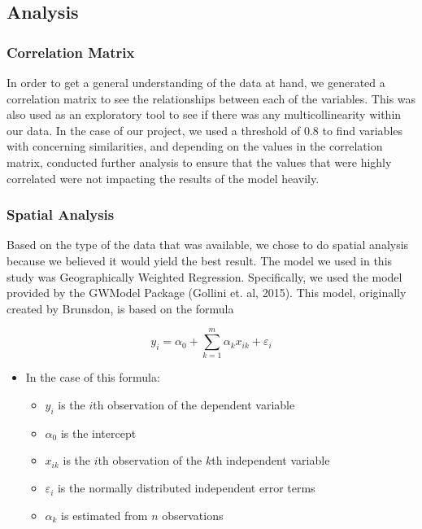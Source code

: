 \documentclass[
]{article}
\providecommand{\tightlist}{%
  \setlength{\itemsep}{0pt}\setlength{\parskip}{0pt}}\usepackage{longtable,booktabs,array}
\begin{document}
\subsection{Analysis}\label{analysis}

\subsubsection{Correlation Matrix}\label{correlation-matrix}

In order to get a general understanding of the data at hand, we
generated a correlation matrix to see the relationships between each of
the variables. This was also used as an exploratory tool to see if there
was any multicollinearity within our data. In the case of our project,
we used a threshold of 0.8 to find variables with concerning
similarities, and depending on the values in the correlation matrix,
conducted further analysis to ensure that the values that were highly
correlated were not impacting the results of the model heavily.

\subsubsection{Spatial Analysis}\label{spatial-analysis}

Based on the type of the data that was available, we chose to do spatial
analysis because we believed it would yield the best result. The model
we used in this study was Geographically Weighted Regression.
Specifically, we used the model provided by the GWModel Package (Gollini
et. al, 2015). This model, originally created by Brunsdon, is based on
the formula

\[y_i = \alpha_{0} + \sum_{k=1}^{m} \alpha_{k}x_{ik} + \varepsilon_{i}\]

\begin{itemize}
\tightlist
\item
  In the case of this formula:

  \begin{itemize}
  \tightlist
  \item
    \(y_i\) is the \(i\)th observation of the dependent variable
  \item
    \(\alpha_0\) is the intercept
  \item
    \(x_{ik}\) is the \(i\)th observation of the \(k\)th independent
    variable
  \item
    \(\varepsilon_{i}\) is the normally distributed independent error
    terms
  \item
    \(\alpha_{k}\) is estimated from \(n\) observations
  \end{itemize}
\end{itemize}
\end{document}
